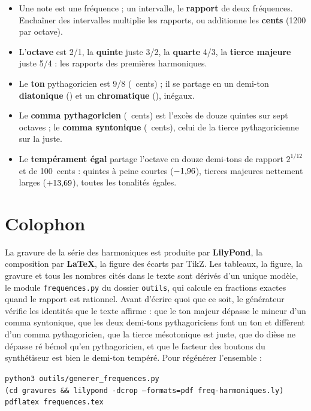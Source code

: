 \documentclass[a4paper,11pt]{article}
\begin{document}
\begin{remarque}
\begin{itemize}[leftmargin=1.2em]
  \item Une note est une fréquence ; un intervalle, le \textbf{rapport} de deux
    fréquences. Enchaîner des intervalles multiplie les rapports, ou additionne
    les \textbf{cents} (1200 par octave).
  \item L'\textbf{octave} est 2/1, la \textbf{quinte} juste 3/2, la
    \textbf{quarte} 4/3, la \textbf{tierce majeure} juste 5/4 : les rapports
    des premières harmoniques.
  \item Le \textbf{ton} pythagoricien est 9/8 (\tonMaj~cents) ; il se partage
    en un demi-ton \textbf{diatonique} (\limma) et un \textbf{chromatique}
    (\apotome), inégaux.
  \item Le \textbf{comma pythagoricien} (\commaPyth~cents) est l'excès de douze
    quintes sur sept octaves ; le \textbf{comma syntonique} (\commaSynt~cents),
    celui de la tierce pythagoricienne sur la juste.
  \item Le \textbf{tempérament égal} partage l'octave en douze demi-tons de
    rapport $2^{1/12}$ et de 100~cents : quintes à peine courtes
    ($-1{,}96$), tierces majeures nettement larges ($+13{,}69$),
    toutes les tonalités égales.
\end{itemize}
\end{remarque}

\section*{Colophon}

La gravure de la série des harmoniques est produite par \textbf{LilyPond}, la
composition par \textbf{\LaTeX}, la figure des écarts par TikZ. Les tableaux,
la figure, la gravure et tous les nombres cités dans le texte sont dérivés
d'un unique modèle, le module \texttt{frequences.py} du dossier
\texttt{outils}, qui calcule en fractions exactes quand le rapport est
rationnel. Avant d'écrire quoi que ce soit, le générateur vérifie les
identités que le texte affirme : que le ton majeur dépasse le mineur d'un
comma syntonique, que les deux demi-tons pythagoriciens font un ton et
diffèrent d'un comma pythagoricien, que la tierce mésotonique est juste, que
do dièse ne dépasse ré bémol qu'en pythagoricien, et que le facteur des
boutons du synthétiseur est bien le demi-ton tempéré. Pour régénérer
l'ensemble :

\medskip\noindent\begin{minipage}{\linewidth}
\centering
\texttt{python3 outils/generer\_frequences.py}\\
\texttt{(cd gravures \&\& lilypond -dcrop --formats=pdf freq-harmoniques.ly)}\\
\texttt{pdflatex frequences.tex}
\end{minipage}
\end{document}
